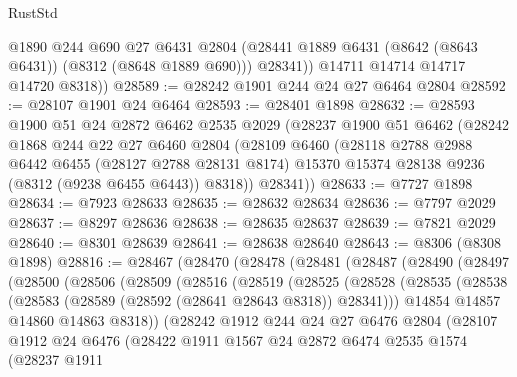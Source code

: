 \begin{lexlean}{RustStd}
\begin{coremodule}
            @1890
            @244
            @690
            @27
            @6431
            @2804
            (@28441 @1889 @6431 (@8642 (@8643 @6431)) (@8312 (@8648 @1889 @690)))
            @28341))
        @14711
        @14714
        @14717
        @14720
        @8318))
@28589 := @28242 @1901 @244 @24 @27 @6464 @2804
@28592 := @28107 @1901 @24 @6464
@28593 := @28401 @1898
@28632 := @28593
    @1900
    @51
    @24
    @2872
    @6462
    @2535
    @2029
    (@28237
      @1900
      @51
      @6462
      (@28242
        @1868
        @244
        @22
        @27
        @6460
        @2804
        (@28109
          @6460
          (@28118
            @2788
            @2988
            @6442
            @6455
            (@28127 @2788 @28131 @8174)
            @15370
            @15374
            @28138
            @9236
            (@8312 (@9238 @6455 @6443))
            @8318))
        @28341))
@28633 := @7727 @1898
@28634 := @7923 @28633
@28635 := @28632 @28634
@28636 := @7797 @2029
@28637 := @8297 @28636
@28638 := @28635 @28637
@28639 := @7821 @2029
@28640 := @8301 @28639
@28641 := @28638 @28640
@28643 := @8306 (@8308 @1898)
@28816 := @28467
    (@28470
      (@28478
        (@28481
          (@28487
            (@28490
              (@28497
                (@28500
                  (@28506
                    (@28509
                      (@28516
                        (@28519
                          (@28525
                            (@28528
                              (@28535
                                (@28538 (@28583 (@28589 (@28592 (@28641 @28643 @8318)) @28341)))
                                @14854
                                @14857
                                @14860
                                @14863
                                @8318))
                            (@28242
                              @1912
                              @244
                              @24
                              @27
                              @6476
                              @2804
                              (@28107
                                @1912
                                @24
                                @6476
                                (@28422
                                  @1911
                                  @1567
                                  @24
                                  @2872
                                  @6474
                                  @2535
                                  @1574
                                  (@28237
                                    @1911

\end{coremodule}
\end{lexlean}
